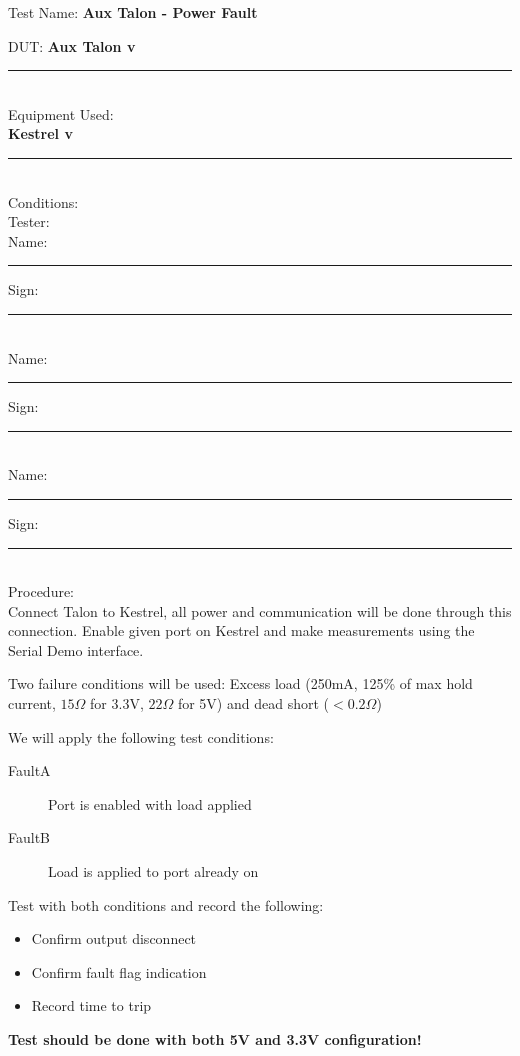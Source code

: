 {\Huge Test Name: \textbf{Aux Talon - Power Fault}}\\[20pt]
{\Large DUT: \textbf{Aux Talon v}\rule{1cm}{0.15mm}} \\[10pt]
{\Large Equipment Used: }\\[5pt]
\textbf{Kestrel v}\rule{1cm}{0.15mm} \\[40pt]
{\Large Conditions: } \\[40pt]
{\Large Tester: }\\[10pt]
Name: \rule{4cm}{0.15mm} \hfill Sign: \rule{4cm}{0.15mm}\\[5pt]
Name: \rule{4cm}{0.15mm} \hfill Sign: \rule{4cm}{0.15mm}\\[5pt]
Name: \rule{4cm}{0.15mm} \hfill Sign: \rule{4cm}{0.15mm}\\[15pt]
{\Large Procedure: }\\
Connect Talon to Kestrel, all power and communication will be done through this connection. Enable given port on Kestrel and make measurements using the Serial Demo interface. 

Two failure conditions will be used: Excess load (250mA, 125\% of max hold current, $15\Omega$ for 3.3V, $22\Omega$ for 5V) and dead short ($< 0.2 \Omega$)

We will apply the following test conditions:
\begin{description}
\item [FaultA] Port is enabled with load applied 
\item [FaultB] Load is applied to port already on
\end{description}

Test with both conditions and record the following:
\begin{itemize}
\item Confirm output disconnect
\item Confirm fault flag indication 
\item Record time to trip
\end{itemize}

\textbf{Test should be done with both 5V and 3.3V configuration!} \\[5pt]




